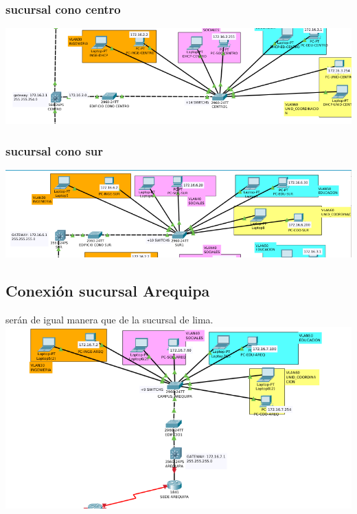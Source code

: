 \subsubsection{sucursal cono centro}
\includegraphics[scale=0.45]{img/VLANCENTRO.png} 

\subsubsection{sucursal cono sur}
\includegraphics[scale=0.45]{img/VLANSUR.png} 

\subsection{Conexi\'on sucursal Arequipa}
ser\'an de igual manera que de la sucursal de lima.
\\
\includegraphics[scale=0.45]{img/VLANAREQUIPA.png} 

